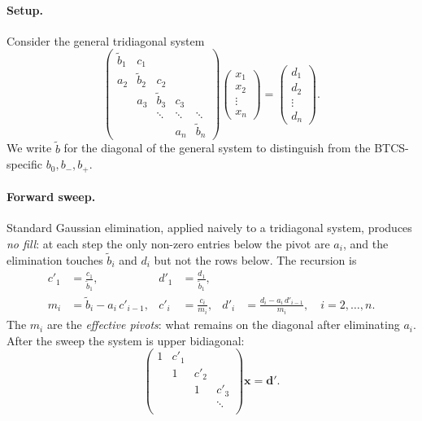 \documentclass[11pt,a4paper]{article}
\begin{document}
\paragraph{Setup.} Consider the general tridiagonal system
\[
\begin{pmatrix}
\tilde b_1 & c_1        &            &            &        \\
a_2        & \tilde b_2 & c_2        &            &        \\
           & a_3        & \tilde b_3 & c_3        &        \\
           &            & \ddots     & \ddots     & \ddots \\
           &            &            & a_n        & \tilde b_n
\end{pmatrix}
\begin{pmatrix} x_1 \\ x_2 \\ \vdots \\ x_n \end{pmatrix}
=
\begin{pmatrix} d_1 \\ d_2 \\ \vdots \\ d_n \end{pmatrix}.
\]
We write $\tilde b$ for the diagonal of the general system to
distinguish from the BTCS-specific $b_0, b_-, b_+$.

\paragraph{Forward sweep.} Standard Gaussian elimination, applied
naively to a tridiagonal system, produces \emph{no fill}: at each
step the only non-zero entries below the pivot are $a_i$, and the
elimination touches $\tilde b_i$ and $d_i$ but not the rows below.
The recursion is
\begin{align}
c'_1 &= \frac{c_1}{\tilde b_1}, &
d'_1 &= \frac{d_1}{\tilde b_1}, \nonumber \\
m_i  &= \tilde b_i - a_i\,c'_{i-1}, &
c'_i &= \frac{c_i}{m_i}, &
d'_i &= \frac{d_i - a_i\,d'_{i-1}}{m_i}, \quad i = 2, \dots, n.
\label{eq:thomas-forward}
\end{align}
The $m_i$ are the \emph{effective pivots}: what remains on the
diagonal after eliminating $a_i$. After the sweep the system is
upper bidiagonal:
\[
\begin{pmatrix}
1 & c'_1 &       &       \\
  & 1    & c'_2  &       \\
  &      & 1     & c'_3  \\
  &      &       & \ddots \\
\end{pmatrix}
\mathbf{x} = \mathbf{d'}.
\]
\end{document}
